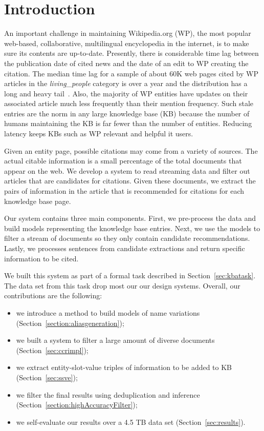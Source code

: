 
\section{Introduction}


An important challenge in maintaining Wikipedia.org (WP), the most popular 
web-based, collaborative, multilingual encyclopedia in the internet, is to 
make sure its contents are up-to-date. Presently, there is considerable time lag 
between the publication date of cited news and the date of an edit to WP 
creating the citation. The median time lag for a sample of about 60K
web pages cited by WP articles in the \textit{living\_people} category is over 
a year and the distribution has a long and heavy tail~\cite{JFrank12}. 
Also, the majority of WP entities have updates on their associated article much 
less frequently than their mention frequency. Such stale entries 
are the norm in any large knowledge base (KB) because the number of humans 
maintaining the KB is far fewer than the number of entities. 
Reducing latency keeps KBs such as WP relevant and helpful it users.

Given an entity page, possible citations may come from a variety of sources.
The actual citable information is a small percentage of the total documents that appear on the web.
We develop a system to read streaming data and filter out articles that are candidates for citations.
Given these documents, we extract the pairs of information in the 
article that is recommended for citations for each knowledge base page.

Our system contains three main components. First, we pre-process the data and
build models representing the knowledge base entries.
Next, we use the models to filter a stream of documents so they only contain 
candidate recommendations.
Lastly, we processes sentences from candidate extractions and return 
specific information to be cited.


We built this system as part of a formal task described in Section~\ref{sec:kbatask}.
The data set from this task drop most our our design systems.
Overall, our contributions are the following:
\begin{itemize}[noitemsep,nolistsep]
\item we introduce a method to build models of name variations (Section~\ref{section:aliasgeneration});
\item we built a system to filter a large amount of diverse documents (Section~\ref{sec:ccrimpl});
\item we extract entity-slot-value triples of information to be added to KB (Section~\ref{sec:ssve});
\item we filter the final results using deduplication and inference (Section~\ref{section:highAccuracyFilter});
\item we self-evaluate our results over a 4.5 TB data set (Section~\ref{sec:results}).
\end{itemize}


